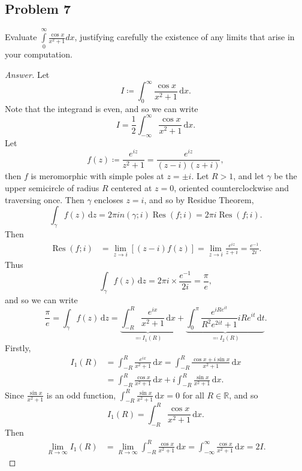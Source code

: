 \documentclass[12pt]{article}
\newcommand{\real}{\mathbb{R}}
\newcommand{\sqbrack}[1]{\left [ #1 \right ]}
\newcommand{\ds}{\displaystyle}
\theoremstyle{definition}
\DeclareMathOperator\Res{Res}
\begin{document}
\subsection{Problem 7 \texorpdfstring{\cite{Lin}}{}}
Evaluate $\ds \int\limits_0^{\infty} \frac{\cos x}{x^2 + 1} dx$, justifying carefully the existence of any limits that arise in your computation.
\begin{proof}[Answer]
    Let 
    \[
        I \coloneqq \int_0^{\infty} \frac{\cos x}{x^2 + 1} \, \mathrm{d}x.
    \]
    Note that the integrand is even, and so we can write
    \[
        I = \frac{1}{2} \int_{-\infty}^{\infty} \frac{\cos x}{x^2 + 1} \, \mathrm{d}x.
    \]
    Let 
    \[
        f(z) \coloneqq \frac{e^{iz}}{z^2 + 1} = \frac{e^{iz}}{(z-i)(z+i)},
    \]
    then $f$ is meromorphic with simple poles at $z = \pm i$. Let $R>1$, and let $\gamma$ be the upper semicircle of radius $R$ centered at $z = 0$, oriented counterclockwise and traversing once. Then $\gamma$ encloses $z = i$, and so by Residue Theorem,
    \[
        \int_{\gamma} f(z) \, \mathrm{d}z = 2\pi i n(\gamma;i) \Res(f;i) = 2\pi i \Res(f;i).
    \]
    Then 
    \begin{align*}
        \Res(f;i) & = \lim\limits_{z \to i} \sqbrack{ (z-i) f(z) } = \lim\limits_{z \to i} \frac{e^{iz}}{z+i} = \frac{e^{-1}}{2i}.
    \end{align*}
    Thus 
    \[
        \int_{\gamma} f(z) \, \mathrm{d}z = 2\pi i \times \frac{e^{-1}}{2i} = \frac{\pi}{e},
    \]
    and so we can write
    \[
        \frac{\pi}{e} = \int_{\gamma} f(z) \, \mathrm{d}z = \underbrace{ \int_{-R}^R \frac{e^{ix}}{x^2 + 1} \, \mathrm{d}x }_{ \eqqcolon I_1(R) } + \underbrace{ \int_0^{\pi} \frac{e^{iRe^{it}}}{R^2e^{2it}+1} iRe^{it} \, \mathrm{d}t }_{ \eqqcolon I_2(R) }.
    \]
    Firstly, 
    \begin{align*}
        I_1(R) & = \int_{-R}^R \frac{e^{ix}}{x^2 + 1} \, \mathrm{d}x = \int_{-R}^R \frac{\cos x + i \sin x}{x^2 + 1} \, \mathrm{d}x \\
        & = \int_{-R}^R \frac{\cos x}{x^2 + 1} \, \mathrm{d}x + i \int_{-R}^R \frac{\sin x}{x^2 + 1} \, \mathrm{d}x.
    \end{align*}
    Since $\frac{\sin x}{x^2 + 1}$ is an odd function, $\int_{-R}^R \frac{\sin x}{x^2 + 1} \, \mathrm{d}x = 0$ for all $R \in \real$, and so 
    \[
        I_1(R) = \int_{-R}^R \frac{\cos x}{x^2 + 1} \, \mathrm{d}x.
    \]
    Then 
    \begin{align*}
        \lim\limits_{R \to \infty} I_1(R) & = \lim\limits_{R \to \infty} \int_{-R}^R \frac{\cos x}{x^2 + 1} \, \mathrm{d}x = \int_{-\infty}^{\infty} \frac{\cos x}{x^2 + 1} \, \mathrm{d}x = 2I.

\end{align*}
\end{proof}
\end{document}
